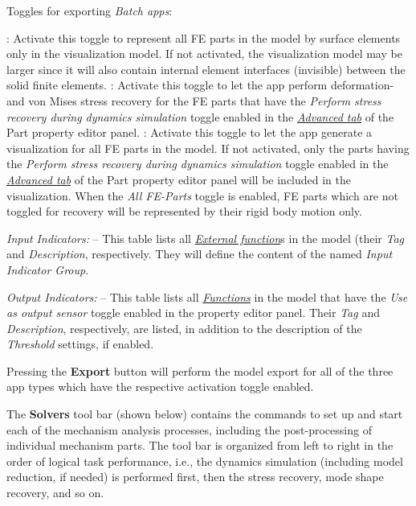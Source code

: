 {\begin{bulletlist}
\item Toggles for exporting {\sl Batch apps}:
  \begin{itemize}
   :
    Activate this toggle to represent all FE parts in the model by surface
    elements only in the visualization model. If not activated,
    the visualization model may be larger since it will also contain internal
    element interfaces (invisible) between the solid finite elements.
   :
    Activate this toggle to let the app perform deformation- and von Mises
    stress recovery for the FE parts that have the
    {\sl Perform stress recovery during dynamics simulation} toggle enabled in
    the \protect\hyperlink{advanced-tab}{\sl Advanced tab} of
    the Part property editor panel.
   :
    Activate this toggle to let the app generate a visualization for all
    FE parts in the model. If not activated, only the parts having the
    {\sl Perform stress recovery during dynamics simulation} toggle enabled
    in the \protect\hyperlink{advanced-tab}{\sl Advanced tab} of the Part
    property editor panel will be included in the visualization. When the
    {\sl All FE-Parts} toggle is enabled, FE parts which are not toggled for
    recovery will be represented by their rigid body motion only.
  \end{itemize}

\item{\sl Input Indicators:} --
  This table lists all
  \protect\hyperlink{external-function}{\sl External function}s in the model
  (their {\sl Tag} and {\sl Description}, respectively.
  They will define the content of the named {\sl Input Indicator Group}.

\item{\sl Output Indicators:} --
  This table lists all \protect\hyperlink{functions}{\sl Functions} in the model
  that have the {\sl Use as output sensor} toggle enabled in the property editor
  panel. Their {\sl Tag} and {\sl Description}, respectively, are listed,
  in addition to the description of the {\sl Threshold} settings, if enabled.
\end{bulletlist}

Pressing the \textbf{Export} button will perform the model export for all of the
three app types which have the respective activation toggle enabled.



The \textbf{Solvers} tool bar (shown below) contains the commands to set up and
start each of the mechanism analysis processes, including the post-processing
of individual mechanism parts. The tool bar is organized from left to right
in the order of logical task performance, i.e., the dynamics simulation
(including model reduction, if needed) is performed first,
then the stress recovery, mode shape recovery, and so on.

}
